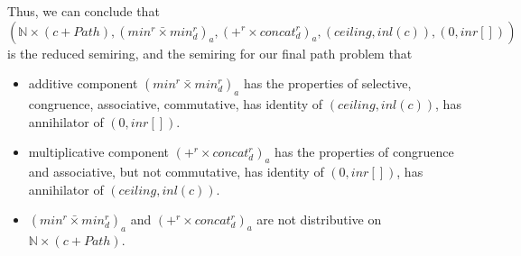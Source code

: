\documentclass[a4paper,10pt]{article}
\begin{document}
Thus, we can conclude that \[(\mathbb{N} \times (c + Path),(min^r \bar{\times} min^r_d)_a,(+^r \times concat^r_d)_a,(ceiling,inl(c)),(0,inr[]))\] is the reduced semiring, and the semiring for our final path problem that 
\begin{itemize}
  \item additive component $(min^r \bar{\times} min^r_d)_a$ has the properties of selective, congruence, associative, commutative, has identity of $(ceiling,inl(c))$, has annihilator of $(0,inr[])$.
  \item multiplicative component $(+^r \times concat^r_d)_a$ has the properties of congruence and associative, but not commutative, has identity of $(0,inr[])$, has annihilator of $(ceiling,inl(c))$.
  \item $(min^r \bar{\times} min^r_d)_a$ and $(+^r \times concat^r_d)_a$ are not distributive on $\mathbb{N} \times (c + Path)$.
\end{itemize}

\medskip

 

\end{document}
